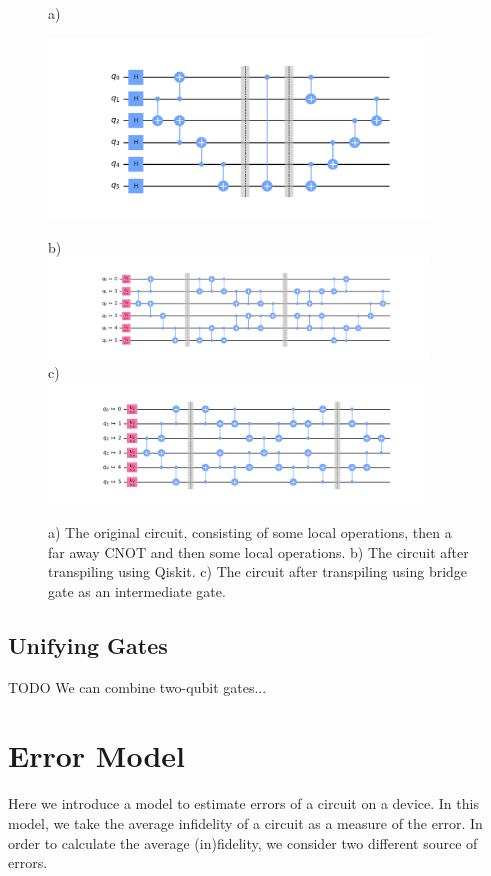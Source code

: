 \documentclass{report}
\begin{document}
\begin{figure}
  a) \\
  \begin{center}
  \includegraphics[width=0.9\textwidth]{../code/expm_1_bridge/out/original_circuit}
  \end{center}
  b) \\
  \includegraphics[width=0.9\textwidth]{../code/expm_1_bridge/out/transpiled_circuit_swap} \\
  c) \\
  \includegraphics[width=0.9\textwidth]{../code/expm_1_bridge/out/transpiled_circuit_bridge}
  \caption{a) The original circuit, consisting of some local operations, then a far away CNOT and then some local operations. b) The circuit after transpiling using Qiskit. c) The circuit after transpiling using bridge gate as an intermediate gate.}
\end{figure}
\subsection{Unifying Gates}

{ \color{blue} TODO }
We can combine two-qubit gates...

\section{Error Model}
\label{sec:error-model}
Here we introduce a model to estimate errors of a circuit on a device.
In this model, we take the average infidelity of a circuit as a measure of the error. In order to calculate the average (in)fidelity, we consider two different source of errors.
\end{document}
